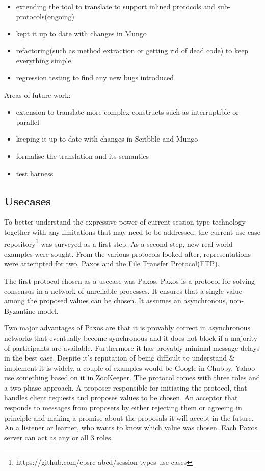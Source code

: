 \begin{itemize}
  \item extending the tool to translate to support inlined protocols and sub-protocols(ongoing)
  \item kept it up to date with changes in Mungo
  \item refactoring(such as method extraction or getting rid of dead code) to keep everything simple
  \item regression testing to find any new bugs introduced
\end{itemize}

Areas of future work:
\begin{itemize}
  \item extension to translate more complex constructs such as interruptible or parallel
  \item keeping it up to date with changes in Scribble and Mungo
  \item formalise the translation and its semantics
  \item test harness
\end{itemize}


\subsection{Usecases}
\label{sub:usecases}

To better understand the expressive power of current session type technology together with any limitations that may need to be addressed, the current use case repository\footnote{https://github.com/epsrc-abcd/session-types-use-cases} was surveyed as a first step. As a second step, new real-world examples were sought. From the various protocols looked after, representations were attempted for two, Paxos and the File Transfer Protocol(FTP).

The first protocol chosen as a usecase was Paxos. Paxos is a protocol for solving consensus in a network of unreliable processes. It ensures that a single value among the proposed values can be chosen. It assumes an asynchronous, non-Byzantine model.\cite{lamport1998part}

Two major advantages of Paxos are that it is provably correct in asynchronous networks that eventually become synchronous and it does not block if a majority of participants are available. Furthermore it has provably minimal message delays in the best case.
Despite it's reputation of being difficult to understand \& implement it is widely, a couple of examples would be Google in Chubby\cite{chandra2007paxos}, Yahoo use something based on it in ZooKeeper.
The protocol comes with three roles and a two-phase approach. A proposer
responsible for initiating the protocol, that handles client requests and
proposes values to be chosen. An acceptor that responds to messages from proposers by either rejecting them or agreeing in principle and making a promise about the proposals it will accept in the future. An a listener or learner, who
wants to know which value was chosen. Each Paxos server can act as any or all 3 roles.\cite{lamport2001paxos}

